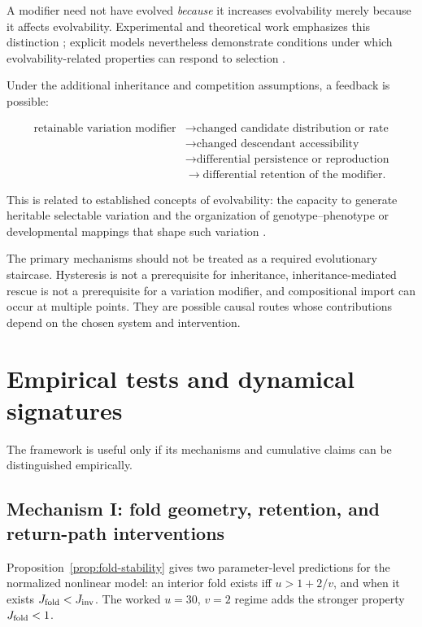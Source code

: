 \documentclass[11pt,a4paper]{article}
\begin{document}
A modifier need not have evolved \emph{because} it increases evolvability merely because it affects evolvability. Experimental and theoretical work emphasizes this distinction \citep{DiazArenas2013,Wagner2022,Pelabon2025}; explicit models nevertheless demonstrate conditions under which evolvability-related properties can respond to selection \citep{EarlDeem2004}.

Under the additional inheritance and competition assumptions, a feedback is possible:

\[
\begin{aligned}
\text{retainable variation modifier}
&\to \text{changed candidate distribution or rate}\\
&\to \text{changed descendant accessibility}\\
&\to \text{differential persistence or reproduction}\\
&\to \text{differential retention of the modifier}.
\end{aligned}
\]

This is related to established concepts of evolvability: the capacity to generate heritable selectable variation and the organization of genotype--phenotype or developmental mappings that shape such variation \citep{WagnerAltenberg1996,Gerhart2007}.

The primary mechanisms should not be treated as a required evolutionary staircase. Hysteresis is not a prerequisite for inheritance, inheritance-mediated rescue is not a prerequisite for a variation modifier, and compositional import can occur at multiple points. They are possible causal routes whose contributions depend on the chosen system and intervention.

\section{Empirical tests and dynamical signatures}

The framework is useful only if its mechanisms and cumulative claims can be distinguished empirically.

\subsection{Mechanism I: fold geometry, retention, and return-path interventions}

Proposition~\ref{prop:fold-stability} gives two parameter-level predictions for the normalized nonlinear model: an interior fold exists iff $u>1+2/v$, and when it exists $J_{\rm fold}<J_{\rm inv}$. The worked $u=30$, $v=2$ regime adds the stronger property $J_{\rm fold}<1$.
\end{document}
